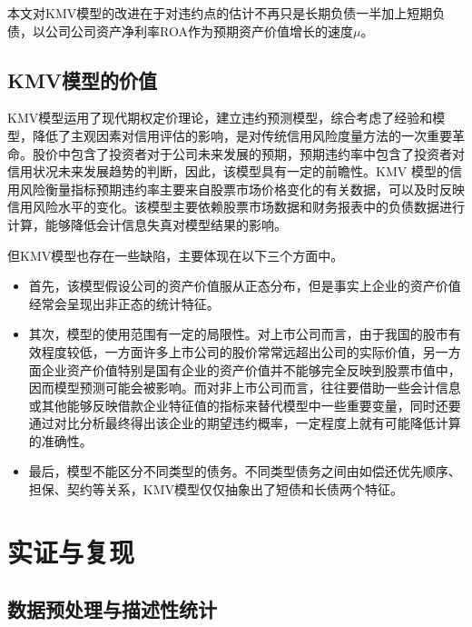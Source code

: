 \documentclass[a4paper,12pt]{ctexart}
\begin{document}
本文对KMV模型的改进在于对违约点的估计不再只是长期负债一半加上短期负债，以公司公司资产净利率ROA作为预期资产价值增长的速度$\mu$。

\subsection{KMV模型的价值}

KMV模型运用了现代期权定价理论，建立违约预测模型，综合考虑了经验和模型，降低了主观因素对信用评估的影响，是对传统信用风险度量方法的一次重要革命。股价中包含了投资者对于公司未来发展的预期，预期违约率中包含了投资者对信用状况未来发展趋势的判断，因此，该模型具有一定的前瞻性。KMV 模型的信用风险衡量指标预期违约率主要来自股票市场价格变化的有关数据，可以及时反映信用风险水平的变化。该模型主要依赖股票市场数据和财务报表中的负债数据进行计算，能够降低会计信息失真对模型结果的影响。

但KMV模型也存在一些缺陷，主要体现在以下三个方面中。
\begin{itemize}
    \item 首先，该模型假设公司的资产价值服从正态分布，但是事实上企业的资产价值经常会呈现出非正态的统计特征。
    \item 其次，模型的使用范围有一定的局限性。对上市公司而言，由于我国的股市有效程度较低，一方面许多上市公司的股价常常远超出公司的实际价值，另一方面企业资产价值特别是国有企业的资产价值并不能够完全反映到股票市值中，因而模型预测可能会被影响。而对非上市公司而言，往往要借助一些会计信息或其他能够反映借款企业特征值的指标来替代模型中一些重要变量，同时还要通过对比分析最终得出该企业的期望违约概率，一定程度上就有可能降低计算的准确性。
    \item 最后，模型不能区分不同类型的债务。不同类型债务之间由如偿还优先顺序、担保、契约等关系，KMV模型仅仅抽象出了短债和长债两个特征。
\end{itemize}

\section{实证与复现}

\subsection{数据预处理与描述性统计}
\end{document}
